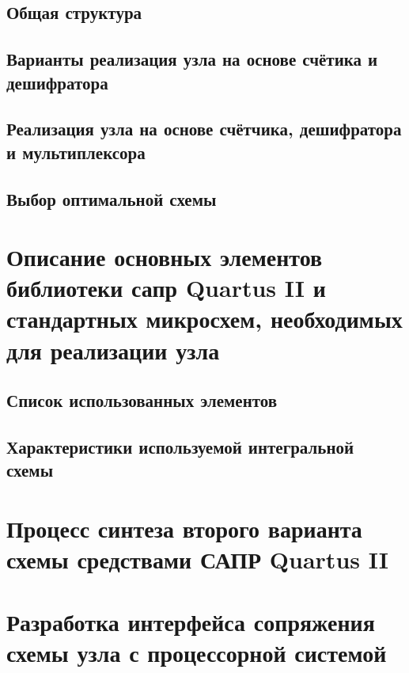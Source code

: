 \documentclass[a4paper,14pt,russian]{article}
\begin{document}
\subsection{Общая структура}

\subsection{Варианты реализация узла на основе счётика и дешифратора}


\subsection{Реализация узла на основе счётчика, дешифратора и мультиплексора}
\label{sections:secondnode}


\subsection{Выбор оптимальной схемы}


\section{Описание основных элементов библиотеки сапр Quartus II и стандартных микросхем, необходимых для реализации узла}

\subsection{Список использованных элементов}


\subsection{Характеристики используемой интегральной схемы}


\section{Процесс синтеза второго варианта схемы средствами САПР Quartus II}


\section{Разработка интерфейса сопряжения схемы узла с процессорной системой}
\label{sections:iface}

\end{document}
